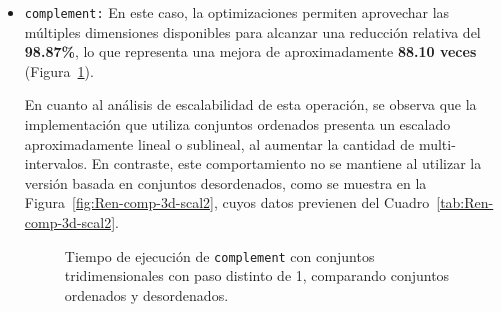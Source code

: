 \begin{itemize}
\begin{itemize}
        \item \texttt{complement:} 
        En este caso, la optimizaciones permiten aprovechar las múltiples dimensiones disponibles para alcanzar una reducción relativa del \textbf{98{.}87\%}, lo que representa una mejora de aproximadamente \textbf{88{.}10 veces} (Figura~\ref{fig:Ren-comp-3d}).

         En cuanto al análisis de escalabilidad de esta operación, se observa que la implementación que utiliza conjuntos ordenados presenta un escalado aproximadamente lineal o sublineal, al aumentar la cantidad de multi-intervalos. En contraste, este comportamiento no se mantiene al utilizar la versión basada en conjuntos desordenados, como se muestra en la Figura~\ref{fig:Ren-comp-3d-scal2}, cuyos datos previenen del Cuadro~\ref{tab:Ren-comp-3d-scal2}.
        
        \begin{figure}[htbp]
          \centering
          \caption{Tiempo de ejecución de \texttt{complement} con conjuntos tridimensionales con paso distinto de 1, comparando conjuntos ordenados y desordenados.}
          \label{fig:Ren-comp-3d}
        \end{figure}


\end{itemize}
\end{itemize}

